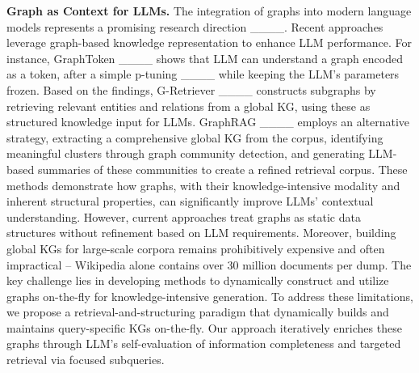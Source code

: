 \textbf{Graph as Context for LLMs.}
The integration of graphs into modern language models represents a promising research direction ____. Recent approaches leverage graph-based knowledge representation to enhance LLM performance. For instance, GraphToken ____ shows that LLM can understand a graph encoded as a token, after a simple p-tuning ____ while keeping the LLM's parameters frozen. Based on the findings, G-Retriever ____ constructs subgraphs by retrieving relevant entities and relations from a global KG, using these as structured knowledge input for LLMs. 
GraphRAG ____ employs an alternative strategy, extracting a comprehensive global KG from the corpus, identifying meaningful clusters through graph community detection, and generating LLM-based summaries of these communities to create a refined retrieval corpus. 
These methods demonstrate how graphs, with their knowledge-intensive modality and inherent structural properties, can significantly improve LLMs' contextual understanding. However, current approaches treat graphs as static data structures without refinement based on LLM requirements. Moreover, building global KGs for large-scale corpora remains prohibitively expensive and often impractical -- Wikipedia alone contains over 30 million documents per dump. The key challenge lies in developing methods to dynamically construct and utilize graphs on-the-fly for knowledge-intensive generation.
To address these limitations, we propose a retrieval-and-structuring paradigm that dynamically builds and maintains query-specific KGs on-the-fly. Our approach iteratively enriches these graphs through LLM's self-evaluation of information completeness and targeted retrieval via focused subqueries.